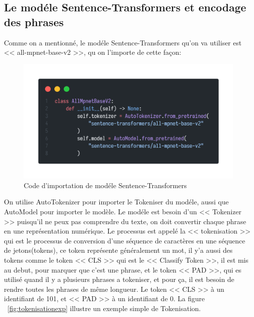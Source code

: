 \subsection{Le modéle Sentence-Transformers et encodage des phrases}
\noindent
Comme on a mentionné, le modéle Sentence-Transformers qu'on va utiliser est << all-mpnet-base-v2 >>, qu on l'importe de cette façon:

\begin{figure}[H]
	\centering
	\includegraphics[width=\textwidth,height=0.75\textheight,keepaspectratio]{logos/import_model.png}
	\caption{Code d'importation de modéle Sentence-Transformers}
	\label{fig:importmodel}
\end{figure}

\newpage
\noindent
On utilise AutoTokenizer pour importer le Tokeniser du modéle, aussi que AutoModel pour importer le modèle. Le modéle est besoin d'un << Tokenizer >> puisqu'il ne peux pas comprendre du texte, on doit convertir chaque phrase en une représentation numérique. Le processus est appelé la << tokenisation >> qui est le processus de conversion d'une séquence de caractères en une séquence de jetons(tokens), ce token représente généralement un mot, il y'a aussi des tokens comme le token << CLS >> qui est le << Classify Token >>, il est mis au debut, pour marquer que c'est une phrase, et le token << PAD >>, qui es utilisé quand il y a plusieurs phrases a tokeniser, et pour ça, il est besoin de rendre toutes les phrases de même longueur. Le token << CLS >> à un identifiant de 101, et << PAD >> à un identifiant de 0. La figure ~\ref{fig:tokenisationexp} illustre un exemple simple de Tokenisation.

